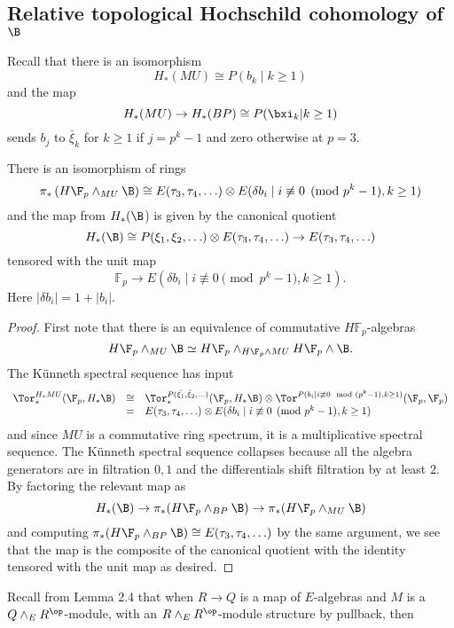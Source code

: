 \subsection{Relative topological Hochschild cohomology of $\B$}
Recall that there is an isomorphism 
\[ H_*(MU)\cong P(b_k \mid k\ge 1) \]
and the map 
\[ H_*(MU) \to  H_*(BP)\cong P(\bxi_k |k\ge 1) \]
sends $b_{j}$ to $\bar{\xi}_k$ for $k\ge 1$ if $j=p^k-1$ and zero otherwise at $p=3$. 

\begin{lem}
There is an isomorphism of rings 
\[ \pi_*\left (H\F_p\wedge_{MU}\B \right ) \cong  E(\tau_3,\tau_4,\ldots )\otimes E(\delta b_i \mid i\not \equiv 0 \pmod{p^k-1}, k\ge 1) \]
and the map from $H_*(\B$) is given by the canonical quotient 
\[ H_*(\B) \cong P(\xi_1,\xi_2,\ldots ) \otimes E(\tau_3,\tau_4,\ldots ) \to E(\tau_3,\tau_4,\ldots )  \]
tensored with the unit map
\[ \mathbb{F}_p \to E(\delta b_i \mid i\not \equiv 0 \pmod{p^k-1}, k\ge 1).\]
Here $|\delta b_i|=1+|b_i|$.
\end{lem}
\begin{proof}
First note that there is an equivalence of commutative $H\mathbb{F}_p$-algebras
\[H\F_p\wedge_{MU}\B \simeq H\F_p\wedge_{H\F_p\wedge MU}H\F_p\wedge \B.\]
The K\"unneth spectral sequence has input 
\[ 
\begin{array}{rcl}
\Tor_*^{H_*MU}(\F_p, H_*\B)&\cong& \Tor_*^{P(\bar{\xi_1},\bar{\xi}_2,\ldots )}(\F_p, H_*\B)\otimes \Tor^{P(  b_i \mid  i\not\equiv 0\mod (p^k-1), k\ge 1)}(\F_p,\F_p)\\
&=& E(\tau_3,\tau_4,\ldots )\otimes E( \delta b_i \mid i\not \equiv 0 \pmod{p^k-1}, k\ge 1)
\end{array}
\]
and since $MU$ is a commutative ring spectrum, it is a multiplicative spectral sequence.
The K\"unneth spectral sequence collapses because all the algebra generators are in filtration $0,1$ and the differentials shift filtration by at least $2$. By factoring the relevant map as  
\[H_*(\B ) \to  \pi_*( H\F_p\wedge_{BP}\B)\to \pi_*(H\F_p\wedge_{MU}\B ) \]
and computing $\pi_*(H\F_p\wedge_{BP}\B)\cong E(\tau_3,\tau_4,\ldots )$ by the same argument, we see that the map is the composite of the canonical quotient 
with the identity tensored with the unit map 
as desired. 
\end{proof}
Recall from Lemma 2.4 \cite{AHL} that when $R\to Q$ is a map of $E$-algebras and $M$ is a $Q\wedge_E R^{\op}$-module, with an $R\wedge_E R^{\op}$-module structure by pullback, then 
